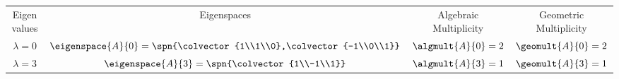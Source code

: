 \begin{tabular}{cccc}
Eigenvalues  & Eigenspaces & Algebraic Multiplicity & Geometric Multiplicity\\
$\lambda = 0$ & $\eigenspace{A}{0} = \spn{\colvector{1\\1\\0},\colvector{-1\\0\\1}}$ & $\algmult{A}{0} = 2$ & $\geomult{A}{0} = 2$\\
$\lambda = 3$ & $\eigenspace{A}{3} =\spn{\colvector{1\\-1\\1}}$ & $\algmult{A}{3} = 1$ & $ \geomult{A}{3} = 1$
\end{tabular}